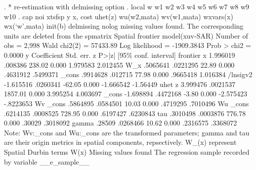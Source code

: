 . * re-estimation with delmissing option 
. local w w1 w2 w3 w4 w5 w6 w7 w8 w9 w10
{\smallskip}
. cap noi xtsfsp y x, cost uhet(z) wu(w2,mata) wv(w1,mata) wxvars(x) wx(`w',mata) init(b) delmissing nolog
missing values found. The corresponding units are deleted from the spmatrix
{\smallskip}
Spatial frontier model(xuv-SAR)                       Number of obs =    2,998
                                                      Wald chi2(2)  = 57433.89
Log likelihood = -1909.3843                           Prob > chi2   =   0.0000
{\smallskip}
           y {\VBAR} Coefficient  Std. err.      z    P>|z|     [95\% conf. interval]
frontier     {\VBAR}
           x {\VBAR}   1.996019    .008386   238.02   0.000     1.979583    2.012455
         W_x {\VBAR}   .5065641   .0221295    22.89   0.000     .4631912    .5499371
       _cons {\VBAR}   .9914628    .012715    77.98   0.000     .9665418    1.016384
    /lnsigv2 {\VBAR}  -1.615516   .0260341   -62.05   0.000    -1.666542    -1.56449
uhet         {\VBAR}
           z {\VBAR}   3.999476   .0021537  1857.01   0.000     3.995254    4.003697
       _cons {\VBAR}  -1.698894   .4472168    -3.80   0.000    -2.575423   -.8223653
Wv           {\VBAR}
       _cons {\VBAR}   .5864895   .0584501    10.03   0.000     .4719295    .7010496
Wu           {\VBAR}
       _cons {\VBAR}   .6214135   .0008525   728.95   0.000     .6197427    .6230843
         tau {\VBAR}   .3010498   .0003876   776.78   0.000       .30029    .3018092
       gamma {\VBAR}     .28509   .0268466    10.62   0.000     .2316575    .3368072
Note: Wv:_cons and Wu:_cons are the transformed parameters;
      gamma and tau are their origin metrics in spatial components, repsectively.
      W_(x) represent Spatial Durbin terms W(x)
      Missing values found
      The regression sample recorded by variable __e_sample__
